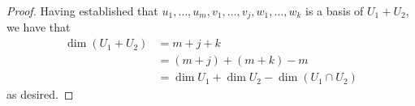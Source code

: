 \documentclass[../main.tex]{subfiles}
\begin{document}
\begin{itemize}
\begin{theorem}
\begin{proof}
            Having established that $u_1,\dots,u_m,v_1,\dots,v_j,w_1,\dots,w_k$ is a basis of $U_1+U_2$, we have that
            \begin{align*}
                \dim(U_1+U_2) &= m+j+k\\
                &= (m+j)+(m+k)-m\\
                &= \dim U_1+\dim U_2-\dim(U_1\cap U_2)
            \end{align*}
            as desired.
        \end{proof}
    \end{theorem}
\end{itemize}
\end{document}
